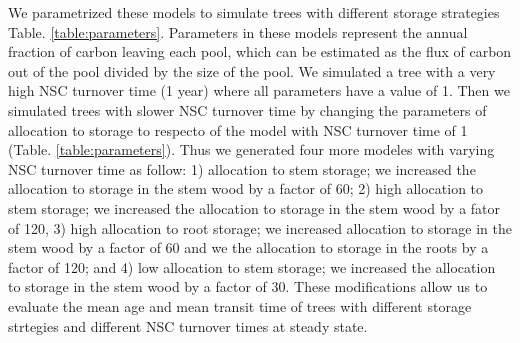 \documentclass{article}
\begin{document}
We parametrized these models to simulate trees with different storage strategies Table. \ref{table:parameters}. 
Parameters in these models represent the annual fraction of carbon leaving each pool, which can be estimated as the flux of carbon out of the pool divided by the size of the pool. 
We simulated a tree with a very high NSC turnover time (1 year) where all parameters have a value of 1. 
Then we simulated trees with slower NSC turnover time by changing the parameters of allocation to storage to respecto of the model with NSC turnover time of 1 (Table. \ref{table:parameters}). 
Thus we generated four more modeles with varying NSC turnover time as follow: 
1) allocation to stem storage; we increased the allocation to storage in the stem wood by a factor of 60; 
2) high allocation to stem storage;  we increased the allocation to storage in the stem wood by a fator of 120,
3) high allocation to root storage;  we increased allocation to storage in the stem wood by a factor of 60 and we the allocation to storage in the roots by a factor of 120;
and 4) low allocation to stem storage; we increased the allocation to storage in the stem wood by a factor of 30.  
These modifications allow us to evaluate the mean age and mean transit time of trees with different storage strtegies and different NSC turnover times at steady state. 
\end{document}
